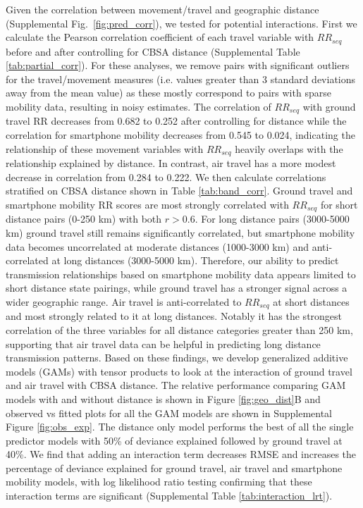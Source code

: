 \documentclass[11pt, letterpaper, oneside]{article}
\begin{document}
Given the correlation between movement/travel and geographic distance (Supplemental Fig.\ \ref{fig:pred_corr}), we tested for potential interactions.
First we calculate the Pearson correlation coefficient of each travel variable with $RR_{seq}$ before and after controlling for CBSA distance (Supplemental Table \ref{tab:partial_corr}).
For these analyses, we remove pairs with significant outliers for the travel/movement measures (i.e. values greater than 3 standard deviations away from the mean value) as these mostly correspond to pairs with sparse mobility data, resulting in noisy estimates.
The correlation of $RR_{seq}$ with ground travel RR decreases from 0.682 to 0.252 after controlling for distance while the correlation for smartphone mobility decreases from 0.545 to 0.024, indicating the relationship of these movement variables with $RR_{seq}$ heavily overlaps with the relationship explained by distance.
In contrast, air travel has a more modest decrease in correlation from 0.284 to 0.222.
We then calculate correlations stratified on CBSA distance shown in Table \ref{tab:band_corr}.
Ground travel and smartphone mobility RR scores are most strongly correlated with $RR_{seq}$ for short distance pairs (0-250 km) with both $r > 0.6$.
For long distance pairs (3000-5000 km) ground travel still remains significantly correlated, but smartphone mobility data becomes uncorrelated at moderate distances (1000-3000 km) and anti-correlated at long distances (3000-5000 km).
Therefore, our ability to predict transmission relationships based on smartphone mobility data appears limited to short distance state pairings, while ground travel has a stronger signal across a wider geographic range.
Air travel is anti-correlated to $RR_{seq}$ at short distances and most strongly related to it at long distances.
Notably it has the strongest correlation of the three variables for all distance categories greater than 250 km, supporting that air travel data can be helpful in predicting long distance transmission patterns.
Based on these findings, we develop generalized additive models (GAMs) with tensor products to look at the interaction of ground travel and air travel with CBSA distance.
The relative performance comparing GAM models with and without distance is shown in Figure \ref{fig:geo_dist}B and observed vs fitted plots for all the GAM models are shown in Supplemental Figure \ref{fig:obs_exp}.
The distance only model performs the best of all the single predictor models with 50\% of deviance explained followed by ground travel at 40\%.
We find that adding an interaction term decreases RMSE and increases the percentage of deviance explained for ground travel, air travel and smartphone mobility models, with log likelihood ratio testing confirming that these interaction terms are significant (Supplemental Table \ref{tab:interaction_lrt}).
\end{document}
